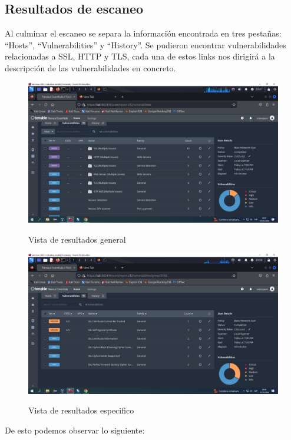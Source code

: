 \documentclass[stu, 11pt, letterpaper, donotrepeattitle, floatsintext, natbib]{apa7}
\begin{document}
\subsection{Resultados de escaneo} 
Al culminar el escaneo se separa la información encontrada en tres pestañas: “Hosts”, “Vulnerabilities” y “History”. Se pudieron encontrar vulnerabilidades relacionadas a SSL, HTTP y TLS, cada una de estos links nos dirigirá a la descripción de las vulnerabilidades en concreto.


\begin{figure}[H]
    \centering
    \caption{Vista de resultados general}
    \includegraphics[width=0.75\linewidth]{Imagen8.png} %
    \label{fig:OverallEffect}
\end{figure}

\begin{figure}[H]
    \centering
    \caption{Vista de resultados especifico}
    \includegraphics[width=0.75\linewidth]{Imagen9.png} %
    \label{fig:OverallEffect}
\end{figure}

De esto podemos observar lo siguiente:
\end{document}
